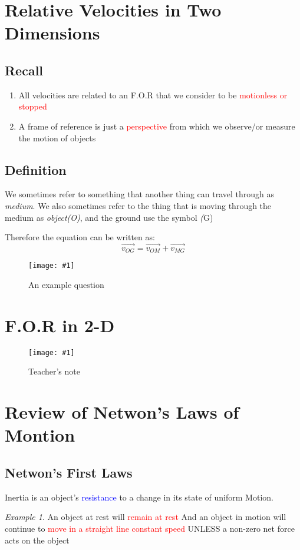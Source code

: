 \documentclass[10pt]{report}
\theoremstyle{remark}
\newtheorem*{example}{Example}
\newcommand{\mypic}[3]{
    \begin{figure}[h!]
        \centering
        \texttt{[image: \#1]}
        \caption{#2}
    \end{figure}
}
\begin{document}
\section{Relative Velocities in Two Dimensions}
\subsection{Recall}
\begin{enumerate}
    \item All velocities are related to an F.O.R that we consider to be \textcolor{red}{motionless or stopped}
    \item A frame of reference is just a \textcolor{red}{perspective} from which we observe/or measure the motion of objects
\end{enumerate}
\subsection{Definition}
We sometimes refer to something that another thing can travel through as \textit{medium}. We also sometimes refer to the thing that is moving through the medium as \textit{object(O)}, and the 
ground use the symbol \textit(G)

Therefore the equation can be written as:
\[
\vec{v_{OG}} = \vec{v_{OM}} + \vec{v_{MG}}
\]

\mypic{graph/graph4.png}{An example question}{0.9}
\newpage
\section{F.O.R in 2-D}
\mypic{graph/graph5.png}{Teacher's note}{0.9}
\newpage

\section{Review of Netwon's Laws of Montion}
\subsection{Netwon's First Laws}
Inertia is an object's \textcolor{blue}{resistance} to a change in its state of uniform Motion.
\begin{example}
    An object at rest will \textcolor{red}{remain at rest} And an object in motion will continue
    to \textcolor{red}{move in a straight line constant speed} UNLESS a non-zero net force acts on 
    the object
\end{example}
\end{document}

